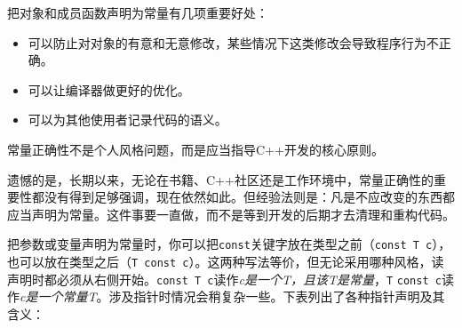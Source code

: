 
把对象和成员函数声明为常量有几项重要好处：



\begin{itemize}
\item 可以防止对对象的有意和无意修改，某些情况下这类修改会导致程序行为不正确。



\item 可以让编译器做更好的优化。



\item 可以为其他使用者记录代码的语义。

\end{itemize}



\begin{myNote}
常量正确性不是个人风格问题，而是应当指导C++开发的核心原则。
\end{myNote}



遗憾的是，长期以来，无论在书籍、C++社区还是工作环境中，常量正确性的重要性都没有得到足够强调，现在依然如此。但经验法则是：凡是不应改变的东西都应当声明为常量。这件事要一直做，而不是等到开发的后期才去清理和重构代码。



把参数或变量声明为常量时，你可以把\texttt{const}关键字放在类型之前（\texttt{const T c}），也可以放在类型之后（\texttt{T const c}）。这两种写法等价，但无论采用哪种风格，读声明时都必须从右侧开始。\texttt{const T c}读作\textit{c是一个T，且该T是常量}，\texttt{T} \texttt{const c}读作\textit{c是一个常量T}。涉及指针时情况会稍复杂一些。下表列出了各种指针声明及其含义：



